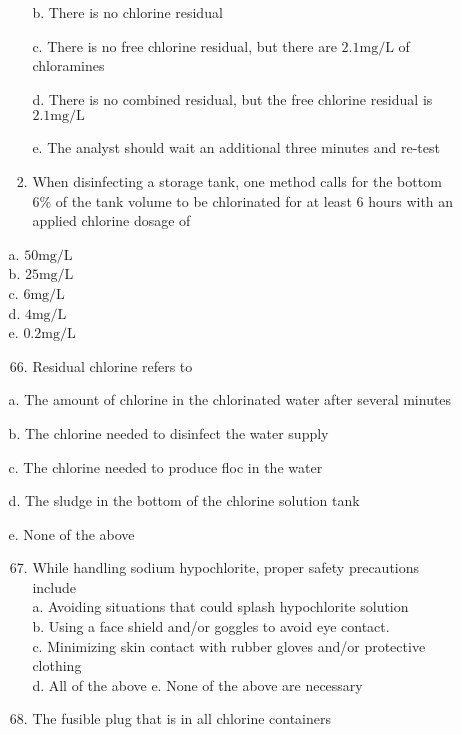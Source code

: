 \documentclass[10pt]{article}
\begin{document}
\begin{enumerate}
\begin{enumerate}
\begin{enumerate}
b. There is no chlorine residual

c. There is no free chlorine residual, but there are $2.1 \mathrm{mg} / \mathrm{L}$ of chloramines

d. There is no combined residual, but the free chlorine residual is $2.1 \mathrm{mg} / \mathrm{L}$

e. The analyst should wait an additional three minutes and re-test 

\item When disinfecting a storage tank, one method calls for the bottom $6 \%$ of the tank volume to be chlorinated for at least 6 hours with an applied chlorine dosage of\\
\end{enumerate}
a. $50 \mathrm{mg} / \mathrm{L}$\\
b. $25 \mathrm{mg} / \mathrm{L}$\\
c. $6 \mathrm{mg} / \mathrm{L}$\\
d. $4 \mathrm{mg} / \mathrm{L}$\\
e. $0.2 \mathrm{mg} / \mathrm{L}$\\

\begin{enumerate}
  \setcounter{enumi}{65}
  \item Residual chlorine refers to
\end{enumerate}

a. The amount of chlorine in the chlorinated water after several minutes

b. The chlorine needed to disinfect the water supply

c. The chlorine needed to produce floc in the water

d. The sludge in the bottom of the chlorine solution tank

e. None of the above

\begin{enumerate}
  \setcounter{enumi}{66}
  \item While handling sodium hypochlorite, proper safety precautions include\\
a. Avoiding situations that could splash hypochlorite solution\\
b. Using a face shield and/or goggles to avoid eye contact.\\
c. Minimizing skin contact with rubber gloves and/or protective clothing\\
d. All of the above e. None of the above are necessary

  \item The fusible plug that is in all chlorine containers


\end{enumerate}
\end{enumerate}
\end{enumerate}
\end{document}
